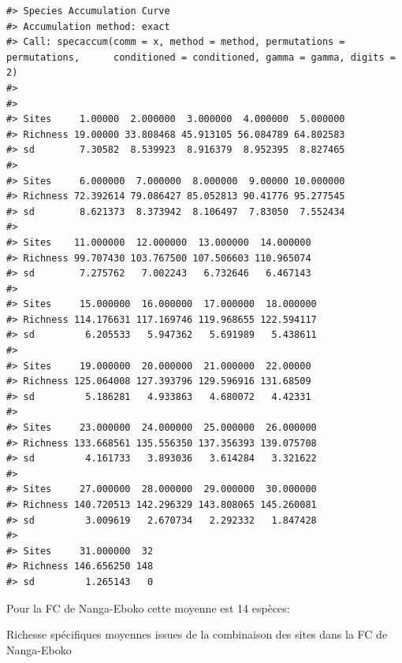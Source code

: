\documentclass[
  12pt,
  a4paper,
  extrafontsizes,
  onecolumn,
  openright]{book}
\theoremstyle{definition}
\theoremstyle{definition}
\theoremstyle{definition}
\theoremstyle{definition}
\theoremstyle{remark}
\begin{document}
\begin{verbatim}
#> Species Accumulation Curve
#> Accumulation method: exact
#> Call: specaccum(comm = x, method = method, permutations = permutations,      conditioned = conditioned, gamma = gamma, digits = 2) 
#> 
#>                                                          
#> Sites     1.00000  2.000000  3.000000  4.000000  5.000000
#> Richness 19.00000 33.808468 45.913105 56.084789 64.802583
#> sd        7.30582  8.539923  8.916379  8.952395  8.827465
#>                                                          
#> Sites     6.000000  7.000000  8.000000  9.00000 10.000000
#> Richness 72.392614 79.086427 85.052813 90.41776 95.277545
#> sd        8.621373  8.373942  8.106497  7.83050  7.552434
#>                                                    
#> Sites    11.000000  12.000000  13.000000  14.000000
#> Richness 99.707430 103.767500 107.506603 110.965074
#> sd        7.275762   7.002243   6.732646   6.467143
#>                                                     
#> Sites     15.000000  16.000000  17.000000  18.000000
#> Richness 114.176631 117.169746 119.968655 122.594117
#> sd         6.205533   5.947362   5.691989   5.438611
#>                                                    
#> Sites     19.000000  20.000000  21.000000  22.00000
#> Richness 125.064008 127.393796 129.596916 131.68509
#> sd         5.186281   4.933863   4.680072   4.42331
#>                                                     
#> Sites     23.000000  24.000000  25.000000  26.000000
#> Richness 133.668561 135.556350 137.356393 139.075708
#> sd         4.161733   3.893036   3.614284   3.321622
#>                                                     
#> Sites     27.000000  28.000000  29.000000  30.000000
#> Richness 140.720513 142.296329 143.808065 145.260081
#> sd         3.009619   2.670734   2.292332   1.847428
#>                        
#> Sites     31.000000  32
#> Richness 146.656250 148
#> sd         1.265143   0
\end{verbatim}

Pour la FC de Nanga-Eboko cette moyenne est 14 espèces:

Richesse spécifiques moyennes issues de la combinaison des sites dans la FC de Nanga-Eboko
\end{document}
